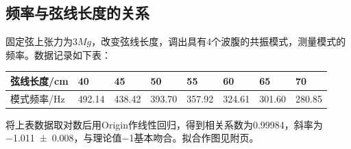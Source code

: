 \documentclass[UTF8]{ctexart}
\begin{document}
\subsection{频率与弦线长度的关系}
固定弦上张力为$3Mg$，改变弦线长度，调出具有4个波腹的共振模式，测量模式的频率。数据记录如下表：
\begin{center}
\begin{tabu}{X[c,-10]|X[c]X[c]X[c]X[c]X[c]X[c]X[c]}
\hline
弦线长度/cm&40&45&50&55&60&65&70\\
\hline
模式频率/Hz&492.14&438.42&393.70&357.92&324.61&301.60&280.85\\
\hline
\end{tabu}
\end{center}
将上表数据取对数后用Origin作线性回归，得到相关系数为\num{.99984}，斜率为\num{-1.011(8)}，与理论值\num{-1}基本吻合。拟合作图见附页。
\begin{figure}[H]
\centering
{}
 \hfill
{} \\
 \hfill
\\
\end{figure}
\end{document}
